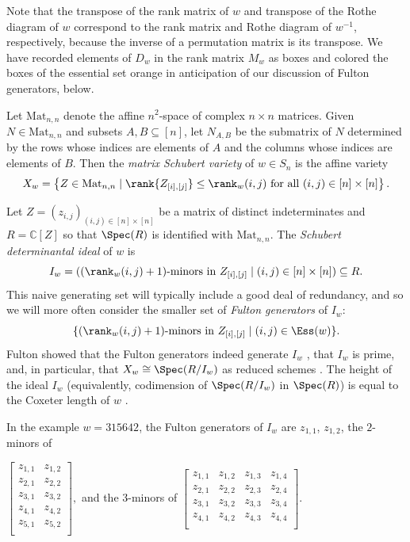 Note that the transpose of the rank matrix of $w$ and transpose of the Rothe diagram of $w$ correspond to the rank matrix and Rothe diagram of $w^{-1}$, respectively, because the inverse of a permutation matrix is its transpose.  We have recorded elements of $D_w$ in the rank matrix $M_w$ as boxes and colored the boxes of the essential set orange in anticipation of our discussion of Fulton generators, below.

Let $\mbox{Mat}_{n,n}$ denote the affine $n^2$-space of complex $n \times n$ matrices.  Given $N \in \mbox{Mat}_{n,n}$ and subsets $A,B \subseteq [n]$, let $N_{A,B}$ be the submatrix of $N$ determined by the rows whose indices are elements of $A$ and the columns whose indices are elements of $B$.  Then the \emph{matrix Schubert variety} of $w \in S_n$ is the affine variety \[
X_w = \left\{Z \in \mbox{Mat}_{n,n}\mid \rank{Z_{[i],[j]}} \leq \rank_w(i,j)\ \mbox{for all}\ (i,j) \in [n] \times [n] \right\}.
\]

Let $Z = (z_{i,j})_{(i,j) \in [n] \times [n]}$ be a matrix of distinct indeterminates and $R = \mathbb{C}[Z]$ so that $\Spec(R)$ is identified with $\mbox{Mat}_{n,n}$.  The \emph{Schubert determinantal ideal} of $w$ is 
\[
I_w = ( (\rank_w(i,j)+1)\text{-minors in } Z_{[i],[j]} \mid (i,j) \in [n] \times [n] ) \subseteq R.
\]  This naive generating set will typically include a good deal of redundancy, and so we will more often consider the smaller set of \emph{Fulton generators} of $I_w$: \[
	\{(\rank_w(i,j)+1)\text{-minors in } Z_{[i],[j]} \mid (i,j) \in \Ess(w) \}.
\]  Fulton showed that the Fulton generators indeed generate $I_w$ \cite[Lemma 3.10]{Ful92}, that $I_w$ is prime, and, in particular, that $X_w \cong \Spec(R/I_w)$ as reduced schemes  \cite[Proposition 3.3]{Ful92}.  The height of the ideal $I_w$ (equivalently, codimension of $\Spec(R/I_w)$ in $\Spec(R)$) is equal to the Coxeter length of $w$ \cite[Proposition 3.3]{Ful92}.

In the example $w = 315642$, the Fulton generators of $I_w$ are $z_{1,1}$, $z_{1,2}$, the $2$-minors of \begin{center} $\begin{bmatrix}
z_{1,1} & z_{1,2}\\
z_{2,1} & z_{2,2}\\
z_{3,1} & z_{3,2}\\
z_{4,1} & z_{4,2}\\
z_{5,1} & z_{5,2}\\
\end{bmatrix},
$ and the $3$-minors of  $\begin{bmatrix}
z_{1,1} & z_{1,2} & z_{1,3} & z_{1,4}\\
z_{2,1} & z_{2,2} & z_{2,3} & z_{2,4}\\
z_{3,1} & z_{3,2} & z_{3,3} & z_{3,4}\\
z_{4,1} & z_{4,2} & z_{4,3} & z_{4,4}\\
\end{bmatrix}.
$ \end{center} 

